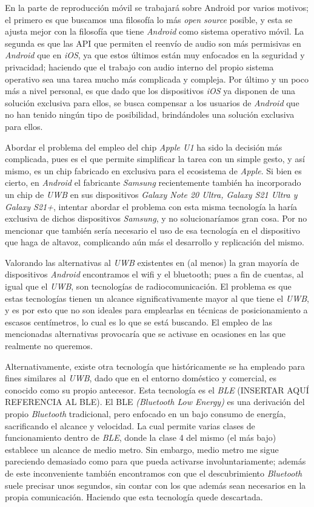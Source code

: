 En la parte de reproducción móvil se trabajará sobre Android por varios motivos;
el primero es que buscamos una filosofía lo más \emph{open source} posible, y
esta se ajusta mejor con la filosofía que tiene \emph{Android} como sistema
operativo móvil. La segunda es que las API que permiten el reenvío de audio son
más permisivas en \emph{Android} que en \emph{iOS}, ya que estos últimos están
muy enfocados en la seguridad y privacidad; haciendo que el trabajo con audio
interno del propio sistema operativo sea una tarea mucho más complicada y
compleja. Por último y un poco más a nivel personal, es que dado que los
dispositivos \emph{iOS} ya disponen de una solución exclusiva para ellos, se
busca compensar a los usuarios de \emph{Android} que no han tenido ningún tipo
de posibilidad, brindándoles una solución exclusiva para ellos.

Abordar el problema del empleo del chip \emph{Apple U1} ha sido la decisión más
complicada, pues es el que permite simplificar la tarea con un simple gesto, y
así mismo, es un chip fabricado en exclusiva para el ecosistema de \emph{Apple}.
Si bien es cierto, en \emph{Android} el fabricante \emph{Samsung} recientemente
también ha incorporado un chip de \emph{UWB} en sus dispositivos \emph{Galaxy
Note 20 Ultra, Galaxy S21 Ultra y Galaxy S21+}, intentar abordar el problema con
esta misma tecnología la haría exclusiva de dichos dispositivos \emph{Samsung},
y no solucionaríamos gran cosa. Por no mencionar que también sería necesario el
uso de esa tecnología en el dispositivo que haga de altavoz, complicando aún más
el desarrollo y replicación del mismo.

Valorando las alternativas al \emph{UWB} existentes en (al menos) la gran
mayoría de dispositivos \emph{Android} encontramos el wifi y el bluetooth; pues
a fin de cuentas, al igual que el \emph{UWB}, son tecnologías de
radiocomunicación. El problema es que estas tecnologías tienen un alcance
significativamente mayor al que tiene el \emph{UWB}, y es por esto que no son
ideales para emplearlas en técnicas de posicionamiento a escasos centímetros, lo
cual es lo que se está buscando. El empleo de las mencionadas alternativas
provocaría que se activase en ocasiones en las que realmente no queremos.

Alternativamente, existe otra tecnología que históricamente se ha empleado para
fines similares al \emph{UWB}, dado que en el entorno doméstico y comercial, es
conocido como su propio antecesor. Esta tecnología es el \emph{BLE} (INSERTAR
AQUÍ REFERENCIA AL BLE). El BLE \emph{(Bluetooth Low Energy)} es una derivación
del propio \emph{Bluetooth} tradicional, pero enfocado en un bajo consumo de
energía, sacrificando el alcance y velocidad. La cual permite varias clases de
funcionamiento dentro de \emph{BLE}, donde la clase 4 del mismo (el más bajo)
establece un alcance de medio metro. Sin embargo, medio metro me sigue
pareciendo demasiado como para que pueda activarse involuntariamente; además de
este inconveniente también encontramos con que el descubrimiento
\emph{Bluetooth} suele precisar unos segundos, sin contar con los que además
sean necesarios en la propia comunicación. Haciendo que esta tecnología quede
descartada.

